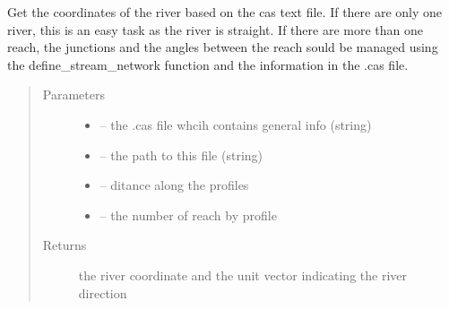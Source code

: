 \documentclass[letterpaper,10pt,english]{sphinxmanual}
\begin{document}
\begin{fulllineitems}
\label{\detokenize{index:src.mascaret.river_coord_non_georef_from_cas}}
Get the coordinates of the river based on the cas text file. If there are only one river, this is an easy task as
the river is straight. If there are more than one reach, the junctions and the angles between the reach sould be
managed using the define\_stream\_network function and the information in the .cas file.
\begin{quote}\begin{description}
\item[{Parameters}] \leavevmode\begin{itemize}
\item {} 
 -- the .cas file whcih contains general info (string)

\item {} 
 -- the path to this file (string)

\item {} 
 -- ditance along the profiles

\item {} 
 -- the number of reach by profile

\end{itemize}

\item[{Returns}] \leavevmode
the river coordinate and the unit vector indicating the river direction

\end{description}\end{quote}

\end{fulllineitems}

\end{document}
